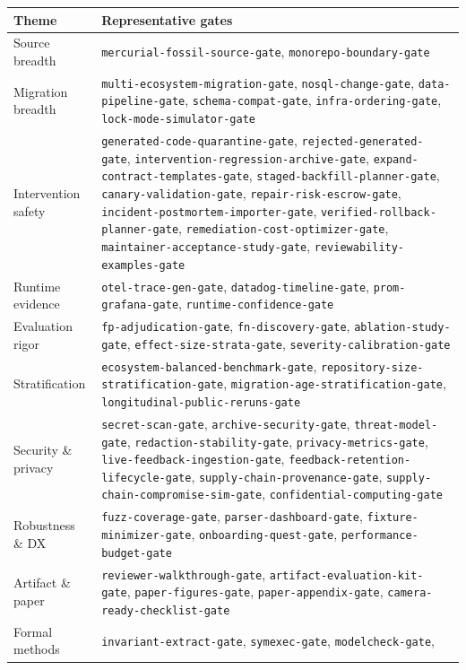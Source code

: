 \documentclass[11pt]{article}
\newcommand{\code}[1]{\texttt{#1}}
\begin{document}
\begin{longtable}{>{\raggedright\arraybackslash}p{3.4cm}>{\raggedright\arraybackslash}p{10.6cm}}
\toprule
\textbf{Theme} & \textbf{Representative gates} \\
\midrule
\endhead
Source breadth & \code{mercurial-fossil-source-gate}, \code{monorepo-boundary-gate} \\
Migration breadth & \code{multi-ecosystem-migration-gate}, \code{nosql-change-gate},
\code{data-pipeline-gate}, \code{schema-compat-gate}, \code{infra-ordering-gate},
\code{lock-mode-simulator-gate} \\
Intervention safety & \code{generated-code-quarantine-gate}, \code{rejected-generated-gate},
\code{intervention-regression-archive-gate}, \code{expand-contract-templates-gate},
\code{staged-backfill-planner-gate}, \code{canary-validation-gate}, \code{repair-risk-escrow-gate},
\code{incident-postmortem-importer-gate}, \code{verified-rollback-planner-gate},
\code{remediation-cost-optimizer-gate}, \code{maintainer-acceptance-study-gate},
\code{reviewability-examples-gate} \\
Runtime evidence & \code{otel-trace-gen-gate}, \code{datadog-timeline-gate}, \code{prom-grafana-gate},
\code{runtime-confidence-gate} \\
Evaluation rigor & \code{fp-adjudication-gate}, \code{fn-discovery-gate}, \code{ablation-study-gate},
\code{effect-size-strata-gate}, \code{severity-calibration-gate} \\
Stratification & \code{ecosystem-balanced-benchmark-gate}, \code{repository-size-stratification-gate},
\code{migration-age-stratification-gate}, \code{longitudinal-public-reruns-gate} \\
Security \& privacy & \code{secret-scan-gate}, \code{archive-security-gate}, \code{threat-model-gate},
\code{redaction-stability-gate}, \code{privacy-metrics-gate}, \code{live-feedback-ingestion-gate},
\code{feedback-retention-lifecycle-gate}, \code{supply-chain-provenance-gate},
\code{supply-chain-compromise-sim-gate}, \code{confidential-computing-gate} \\
Robustness \& DX & \code{fuzz-coverage-gate}, \code{parser-dashboard-gate},
\code{fixture-minimizer-gate}, \code{onboarding-quest-gate}, \code{performance-budget-gate} \\
Artifact \& paper & \code{reviewer-walkthrough-gate}, \code{artifact-evaluation-kit-gate},
\code{paper-figures-gate}, \code{paper-appendix-gate}, \code{camera-ready-checklist-gate} \\
Formal methods & \code{invariant-extract-gate}, \code{symexec-gate}, \code{modelcheck-gate},

\end{longtable}
\end{document}
